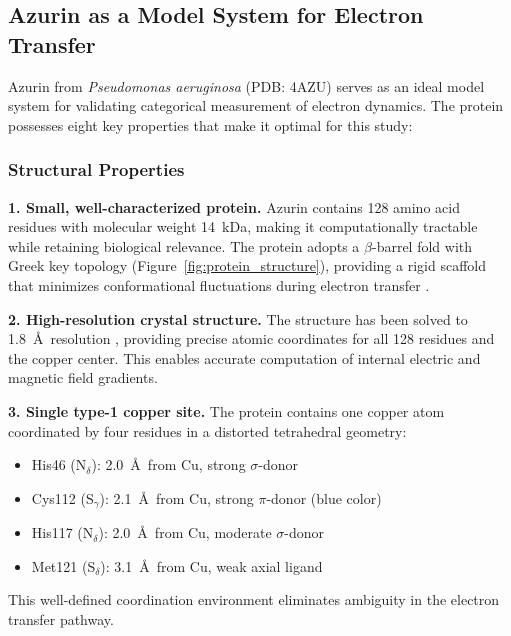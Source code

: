 \documentclass[twocolumn,10pt]{article}
\begin{document}
\subsection{Azurin as a Model System for Electron Transfer}

Azurin from \textit{Pseudomonas aeruginosa} (PDB: 4AZU) \cite{Nar1991} serves 
as an ideal model system for validating categorical measurement of electron 
dynamics. The protein possesses eight key properties that make it optimal for 
this study:

\subsubsection{Structural Properties}

\textbf{1. Small, well-characterized protein.} Azurin contains 128 amino acid 
residues with molecular weight 14~kDa, making it computationally tractable while 
retaining biological relevance. The protein adopts a $\beta$-barrel fold with 
Greek key topology (Figure~\ref{fig:protein_structure}), providing a rigid 
scaffold that minimizes conformational fluctuations during electron transfer 
\cite{Adman1978}.

\textbf{2. High-resolution crystal structure.} The structure has been solved to 
1.8~\AA\ resolution \cite{Nar1991}, providing precise atomic coordinates for 
all 128 residues and the copper center. This enables accurate computation of 
internal electric and magnetic field gradients.

\textbf{3. Single type-1 copper site.} The protein contains one copper atom 
coordinated by four residues in a distorted tetrahedral geometry:
%
\begin{itemize}
\item His46 (N$_\delta$): 2.0~\AA\ from Cu, strong $\sigma$-donor
\item Cys112 (S$_\gamma$): 2.1~\AA\ from Cu, strong $\pi$-donor (blue color)
\item His117 (N$_\delta$): 2.0~\AA\ from Cu, moderate $\sigma$-donor  
\item Met121 (S$_\delta$): 3.1~\AA\ from Cu, weak axial ligand
\end{itemize}
%
This well-defined coordination environment eliminates ambiguity in the electron 
transfer pathway.
\end{document}

